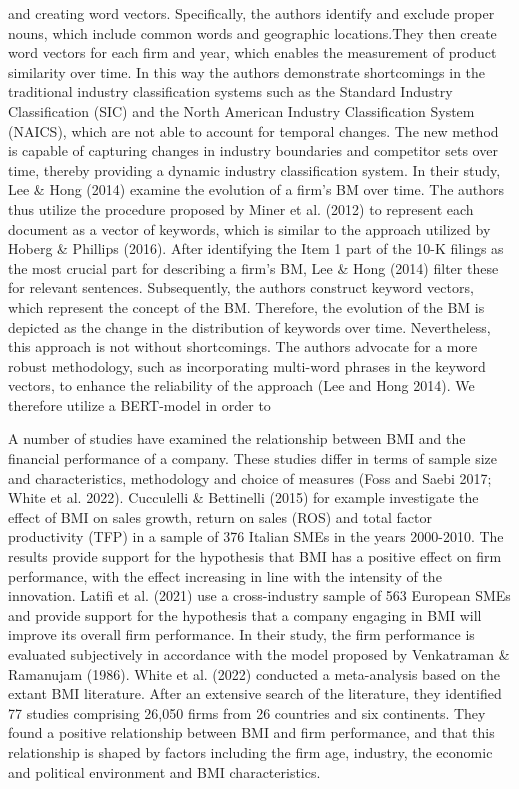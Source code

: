 \documentclass[
]{article}
\begin{document}
and creating word vectors. Specifically, the authors identify and
exclude proper nouns, which include common words and geographic
locations.They then create word vectors for each firm and year, which
enables the measurement of product similarity over time. In this way the
authors demonstrate shortcomings in the traditional industry
classification systems such as the Standard Industry Classification
(SIC) and the North American Industry Classification System (NAICS),
which are not able to account for temporal changes. The new method is
capable of capturing changes in industry boundaries and competitor sets
over time, thereby providing a dynamic industry classification system.
In their study, Lee \& Hong (2014) examine the evolution of a firm's BM
over time. The authors thus utilize the procedure proposed by Miner et
al. (2012) to represent each document as a vector of keywords, which is
similar to the approach utilized by Hoberg \& Phillips (2016). After
identifying the Item 1 part of the 10-K filings as the most crucial part
for describing a firm's BM, Lee \& Hong (2014) filter these for relevant
sentences. Subsequently, the authors construct keyword vectors, which
represent the concept of the BM. Therefore, the evolution of the BM is
depicted as the change in the distribution of keywords over time.
Nevertheless, this approach is not without shortcomings. The authors
advocate for a more robust methodology, such as incorporating multi-word
phrases in the keyword vectors, to enhance the reliability of the
approach (Lee and Hong 2014). We therefore utilize a BERT-model in order
to

A number of studies have examined the relationship between BMI and the
financial performance of a company. These studies differ in terms of
sample size and characteristics, methodology and choice of measures
(Foss and Saebi 2017; White et al. 2022). Cucculelli \& Bettinelli
(2015) for example investigate the effect of BMI on sales growth, return
on sales (ROS) and total factor productivity (TFP) in a sample of 376
Italian SMEs in the years 2000-2010. The results provide support for the
hypothesis that BMI has a positive effect on firm performance, with the
effect increasing in line with the intensity of the innovation. Latifi
et al. (2021) use a cross-industry sample of 563 European SMEs and
provide support for the hypothesis that a company engaging in BMI will
improve its overall firm performance. In their study, the firm
performance is evaluated subjectively in accordance with the model
proposed by Venkatraman \& Ramanujam (1986). White et al. (2022)
conducted a meta-analysis based on the extant BMI literature. After an
extensive search of the literature, they identified 77 studies
comprising 26,050 firms from 26 countries and six continents. They found
a positive relationship between BMI and firm performance, and that this
relationship is shaped by factors including the firm age, industry, the
economic and political environment and BMI characteristics.
\end{document}
